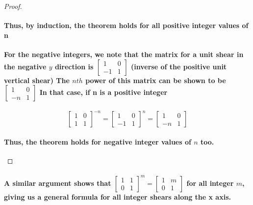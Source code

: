 \documentclass{report}
\begin{document}
\begin{proof}
{\paragraph{Thus, by induction, the theorem holds for all positive integer values of n}

\paragraph{For the negative integers, we note that the matrix for a unit shear in the negative $y$ direction is 
$\begin{bmatrix}
1&0\\-1&1
\end{bmatrix}$
(inverse of the positive unit vertical shear) The $nth$ power of this matrix can be shown to be 
$\begin{bmatrix}
1&0\\-n&1
\end{bmatrix}$
In that case, if n is a positive integer}

\begin{equation}
\begin{bmatrix}
1&0\\1&1
\end{bmatrix}^{-n}
=
\begin{bmatrix}
1&0\\-1&1
\end{bmatrix}^n
=
\begin{bmatrix}
1&0\\-n&1
\end{bmatrix}
\end{equation}

\paragraph{Thus, the theorem holds for negative integer values of $n$ too.}}
\end{proof}

\paragraph{A similar argument shows that
$\begin{bmatrix}
1&1\\0&1
\end{bmatrix}^m
=
\begin{bmatrix}
1&m\\0&1
\end{bmatrix}
$ 
for all integer $m$, giving us a general formula for all integer shears along the x axis.
}
\end{document}
